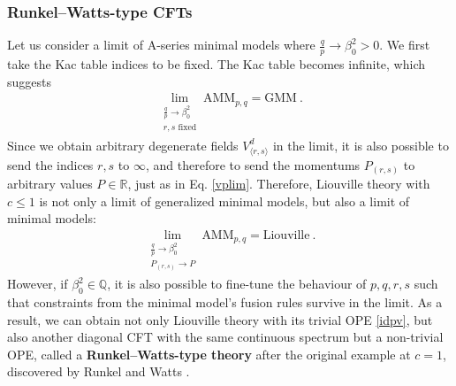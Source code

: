 \documentclass[12pt, a4paper]{article}
\newcommand{\myindex}[1]{\textbf{\boldmath #1}}
\begin{document}
\subsubsection{Runkel--Watts-type CFTs}\label{sec:rwt}

Let us consider a limit of A-series minimal models where $\frac{q}{p}\to \beta_0^2>0$. We first take the Kac table indices to be fixed. 
The Kac table becomes infinite, which suggests 
\begin{align}
 \lim_{\substack{\frac{q}{p}\to \beta_0^2\\ r,s\text{ fixed}}} \text{AMM}_{p,q} = \text{GMM}\ . 
 \label{mm-gmm}
\end{align}
Since we obtain arbitrary degenerate fields $V^d_{\langle r,s\rangle}$ in the limit, it is also possible to send the indices $r,s$ to $\infty$, and therefore to send the momentums $P_{(r,s)}$ to arbitrary values $P\in\mathbb{R}$, just as in Eq. \eqref{vplim}. Therefore, Liouville theory with $c\leq 1$ is not only a limit of generalized minimal models, but also a limit of minimal models:
\begin{align}
 \lim_{\substack{\frac{q}{p}\to \beta_0^2\\ P_{(r,s)}\to P}} \text{AMM}_{p,q} = \text{Liouville}\ . 
 \label{mm-liou}
\end{align}
However, if $\beta_0^2\in\mathbb{Q}$, it is also possible to fine-tune the behaviour of $p,q,r,s$ such that constraints from the minimal model's fusion rules survive in the limit. As a result, we can obtain not only Liouville theory with its trivial OPE \eqref{idpv}, but also another diagonal CFT with the same continuous spectrum but a non-trivial OPE, called a \myindex{Runkel--Watts-type theory} after the original example at $c=1$, discovered by Runkel and Watts \cite{rw01}. 
\end{document}
